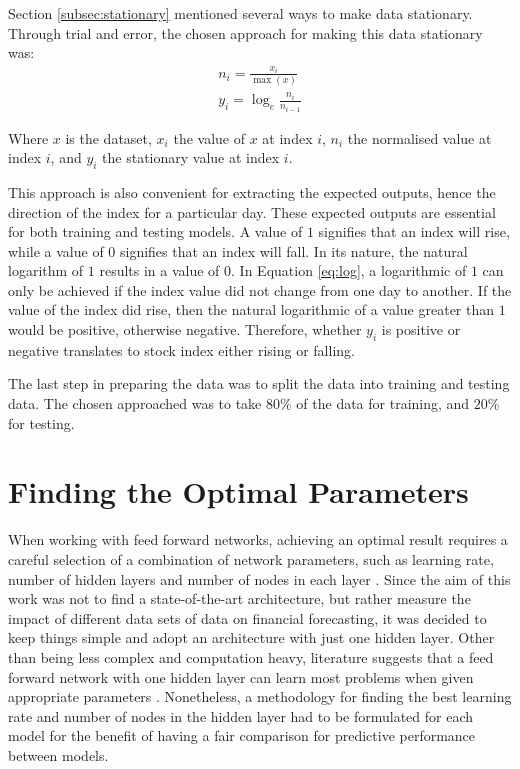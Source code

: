\documentclass{UoYCSproject}
\begin{document}
Section \ref{subsec:stationary} mentioned several ways to make data stationary. Through trial and error, the chosen approach for making this data stationary was:
\begin{align}
n_i = \frac{x_i}{\max(x)} \label{eq:normalised} \\ 
y_i = \log_e\frac{n_i}{n_{i-1}} \label{eq:log} 
\end{align}

Where $x$ is the dataset, $x_i$ the value of $x$ at index $i$, $n_i$ the normalised value at index $i$, and $y_i$ the stationary value at index $i$. 

This approach is also convenient for extracting the expected outputs, hence the direction of the index for a particular day. These expected outputs are essential for both training and testing models. A value of $1$ signifies that an index will rise, while a value of $0$ signifies that an index will fall. In its nature, the natural logarithm of $1$ results in a value of 0. In Equation \ref{eq:log}, a logarithmic of $1$ can only be achieved if the index value did not change from one day to another. If the value of the index did rise, then the natural logarithmic of a value greater than $1$ would be positive, otherwise negative. Therefore, whether $y_i$ is positive or negative translates to stock index either rising or falling.

The last step in preparing the data was to split the data into training and testing data. The chosen approached was to take $80$\% of the data for training, and $20$\% for testing.

\section{Finding the Optimal Parameters}
\label{sec:optimalparams}
When working with feed forward networks, achieving an optimal result requires a careful selection of a combination of network parameters, such as learning rate, number of hidden layers and number of nodes in each layer \cite{hussain2008financial}. Since the aim of this work was not to find a state-of-the-art architecture, but rather measure the impact of different data sets of data on financial forecasting, it was decided to keep things simple and adopt an architecture with just one hidden layer. Other than being less complex and computation heavy, literature suggests that a feed forward network with one hidden layer can learn most problems when given appropriate parameters \cite{cybenko1989approximation}. Nonetheless, a methodology for finding the best learning rate and number of nodes in the hidden layer had to be formulated for each model for the benefit of having a fair comparison for predictive performance between models.   
\end{document}
